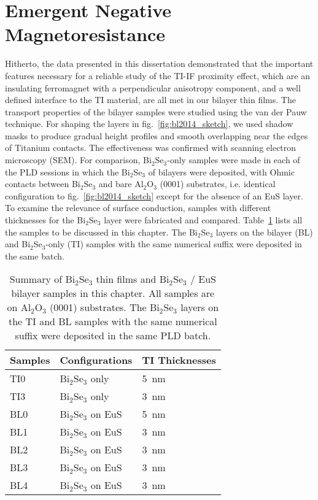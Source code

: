 \section{Emergent Negative Magnetoresistance}\label{sec:bl2014_negtive_MR}
Hitherto, the data presented in this dissertation demonstrated that the important features necessary for a reliable study of the TI-IF proximity effect, which are an insulating ferromagnet with a perpendicular anisotropy component, and a well defined interface to the TI material, are all met in our bilayer thin films. The transport properties of the bilayer samples were studied using the van der Pauw technique. For shaping the layers in fig.~\ref{fig:bl2014_sketch}, we used shadow masks to produce gradual height profiles and smooth overlapping near the edges of Titanium contacts. The effectiveness was confirmed with scanning electron microscopy (SEM). For comparison, Bi$_2$Se$_3$-only samples were made in each of the PLD sessions in which the Bi$_2$Se$_3$ of bilayers were deposited, with Ohmic contacts between Bi$_2$Se$_3$ and bare Al$_2$O$_3$ (0001) substrates, i.e. identical configuration to fig.~\ref{fig:bl2014_sketch} except for the absence of an EuS layer. To examine the relevance of surface conduction, samples with different thicknesses for the Bi$_2$Se$_3$ layer were fabricated and compared. Table~\ref{tab:bl2014_samples} lists all the samples to be discussed in this chapter. The Bi$_2$Se$_3$ layers on the bilayer (BL) and Bi$_2$Se$_3$-only (TI) samples with the same numerical suffix were deposited in the same batch.%
%
\begin{table}[ht]
    \centering
    \begin{tabularx}{0.6\columnwidth}[t]{l|l|X}
		\hline\hline
        Samples & Configurations & TI Thicknesses\\
        \hline
        TI0 & Bi$_2$Se$_3$ only & 5~nm\\
        TI3 & Bi$_2$Se$_3$ only & 3~nm\\
        BL0 & Bi$_2$Se$_3$ on EuS & 5~nm\\
        BL1 & Bi$_2$Se$_3$ on EuS & 3~nm\\
        BL2 & Bi$_2$Se$_3$ on EuS & 3~nm\\
        BL3 & Bi$_2$Se$_3$ on EuS & 3~nm\\
        BL4 & Bi$_2$Se$_3$ on EuS & 3~nm\\
		\hline\hline
    \end{tabularx}
    \caption[Summary of Bi$_2$Se$_3$ thin films and Bi$_2$Se$_3$ / EuS bilayer samples in Chap.~\ref{ch:bilayer2014}]{\label{tab:bl2014_samples}Summary of Bi$_2$Se$_3$ thin films and Bi$_2$Se$_3$ / EuS bilayer samples in this chapter. All samples are on Al$_2$O$_3$ (0001) substrates. The Bi$_2$Se$_3$ layers on the TI and BL samples with the same numerical suffix were deposited in the same PLD batch.}
\end{table}

